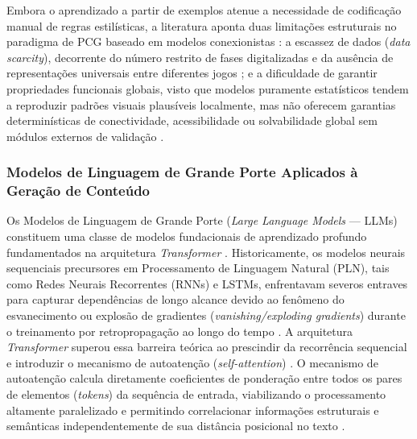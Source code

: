 Embora o aprendizado a partir de exemplos atenue a necessidade de codificação manual de regras estilísticas, a literatura aponta duas limitações estruturais no paradigma de PCG baseado em modelos conexionistas \cite{summerville2018procedural, maleki2024procedural}: a escassez de dados (\textit{data scarcity}), decorrente do número restrito de fases digitalizadas e da ausência de representações universais entre diferentes jogos \cite{summerville2018procedural}; e a dificuldade de garantir propriedades funcionais globais, visto que modelos puramente estatísticos tendem a reproduzir padrões visuais plausíveis localmente, mas não oferecem garantias determinísticas de conectividade, acessibilidade ou solvabilidade global sem módulos externos de validação \cite{summerville2018procedural, maleki2024procedural}.

\subsubsection{Modelos de Linguagem de Grande Porte Aplicados à Geração de Conteúdo}
\label{sec:llms_pcg}

Os Modelos de Linguagem de Grande Porte (\textit{Large Language Models} --- LLMs) constituem uma classe de modelos fundacionais de aprendizado profundo fundamentados na arquitetura \textit{Transformer} \cite{vaswani2017attention, Gallotta_2024}. Historicamente, os modelos neurais sequenciais precursores em Processamento de Linguagem Natural (PLN), tais como Redes Neurais Recorrentes (RNNs) e LSTMs, enfrentavam severos entraves para capturar dependências de longo alcance devido ao fenômeno do esvanecimento ou explosão de gradientes (\textit{vanishing/exploding gradients}) durante o treinamento por retropropagação ao longo do tempo \cite{bengio1994learning}. A arquitetura \textit{Transformer} superou essa barreira teórica ao prescindir da recorrência sequencial e introduzir o mecanismo de autoatenção (\textit{self-attention}) \cite{vaswani2017attention}. O mecanismo de autoatenção calcula diretamente coeficientes de ponderação entre todos os pares de elementos (\textit{tokens}) da sequência de entrada, viabilizando o processamento altamente paralelizado e permitindo correlacionar informações estruturais e semânticas independentemente de sua distância posicional no texto \cite{vaswani2017attention, Gallotta_2024}.

